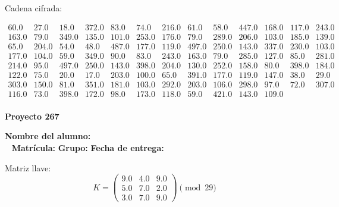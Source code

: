 \documentclass[12pt]{article}
\begin{document}
Cadena cifrada:
\begin{center}
$\begin{array}{lllllllllllll}
60.0 & 27.0 & 18.0 & 372.0 & 83.0 & 74.0 & 216.0 & 61.0 & 58.0 & 447.0 & 168.0 & 117.0 & 243.0\\
163.0 & 79.0 & 349.0 & 135.0 & 101.0 & 253.0 & 176.0 & 79.0 & 289.0 & 206.0 & 103.0 & 185.0 & 139.0\\
65.0 & 204.0 & 54.0 & 48.0 & 487.0 & 177.0 & 119.0 & 497.0 & 250.0 & 143.0 & 337.0 & 230.0 & 103.0\\
177.0 & 104.0 & 59.0 & 349.0 & 90.0 & 83.0 & 243.0 & 163.0 & 79.0 & 285.0 & 127.0 & 85.0 & 281.0\\
214.0 & 95.0 & 497.0 & 250.0 & 143.0 & 398.0 & 204.0 & 130.0 & 252.0 & 158.0 & 80.0 & 398.0 & 184.0\\
122.0 & 75.0 & 20.0 & 17.0 & 203.0 & 100.0 & 65.0 & 391.0 & 177.0 & 119.0 & 147.0 & 38.0 & 29.0\\
303.0 & 150.0 & 81.0 & 351.0 & 181.0 & 103.0 & 292.0 & 203.0 & 106.0 & 298.0 & 97.0 & 72.0 & 307.0\\
116.0 & 73.0 & 398.0 & 172.0 & 98.0 & 173.0 & 118.0 & 59.0 & 421.0 & 143.0 & 109.0\\
\end{array}$
\end{center}

\newpage


\textbf{Proyecto 267}

\textbf{Nombre del alumno:} \underline{\hspace{13cm}}\\\
\vspace{1cm}
\textbf{Matrícula:} \underline{\hspace{4cm}} \hspace{1cm}
\textbf{Grupo:} \underline{\hspace{2cm}}
\textbf{Fecha de entrega:} \underline{\hspace{2cm}}

\medskip

Matriz llave:
\[
K = \begin{pmatrix}
9.0 & 4.0 & 9.0\\
5.0 & 7.0 & 2.0\\
3.0 & 7.0 & 9.0
\end{pmatrix} \pmod{29}
\]
\end{document}
